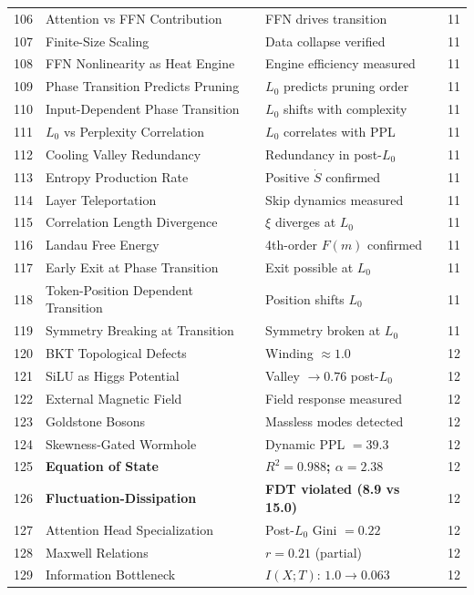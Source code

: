 \documentclass[11pt,a4paper]{article}
\begin{document}
\begin{center}
\begin{longtable}{@{}clll@{}}
106 & Attention vs FFN Contribution & FFN drives transition & 11 \\
107 & Finite-Size Scaling & Data collapse verified & 11 \\
108 & FFN Nonlinearity as Heat Engine & Engine efficiency measured & 11 \\
109 & Phase Transition Predicts Pruning & $L_0$ predicts pruning order & 11 \\
110 & Input-Dependent Phase Transition & $L_0$ shifts with complexity & 11 \\
111 & $L_0$ vs Perplexity Correlation & $L_0$ correlates with PPL & 11 \\
112 & Cooling Valley Redundancy & Redundancy in post-$L_0$ & 11 \\
113 & Entropy Production Rate & Positive $\dot{S}$ confirmed & 11 \\
114 & Layer Teleportation & Skip dynamics measured & 11 \\
115 & Correlation Length Divergence & $\xi$ diverges at $L_0$ & 11 \\
116 & Landau Free Energy & 4th-order $F(m)$ confirmed & 11 \\
117 & Early Exit at Phase Transition & Exit possible at $L_0$ & 11 \\
118 & Token-Position Dependent Transition & Position shifts $L_0$ & 11 \\
119 & Symmetry Breaking at Transition & Symmetry broken at $L_0$ & 11 \\
\midrule
120 & BKT Topological Defects & Winding $\approx 1.0$ & 12 \\
121 & SiLU as Higgs Potential & Valley $\to 0.76$ post-$L_0$ & 12 \\
122 & External Magnetic Field & Field response measured & 12 \\
123 & Goldstone Bosons & Massless modes detected & 12 \\
124 & Skewness-Gated Wormhole & Dynamic PPL $= 39.3$ & 12 \\
125 & \textbf{Equation of State} & \textbf{$R^2 = 0.988$; $\alpha = 2.38$} & 12 \\
126 & \textbf{Fluctuation-Dissipation} & \textbf{FDT violated (8.9 vs 15.0)} & 12 \\
127 & Attention Head Specialization & Post-$L_0$ Gini $= 0.22$ & 12 \\
128 & Maxwell Relations & $r = 0.21$ (partial) & 12 \\
129 & Information Bottleneck & $I(X;T)$: $1.0 \to 0.063$ & 12 \\

\end{longtable}
\end{center}
\end{document}

